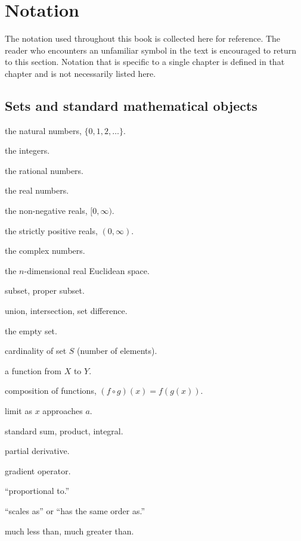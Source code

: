 \chapter*{Notation}

The notation used throughout this book is collected here for reference.
The reader who encounters an unfamiliar symbol in the text is
encouraged to return to this section. Notation that is specific to a
single chapter is defined in that chapter and is not necessarily
listed here.

\section*{Sets and standard mathematical objects}

\begin{notationbox}
\begin{description}[leftmargin=3cm,style=nextline]
    \item[{$\mathbb{N}$}] the natural numbers, $\{0, 1, 2, \dots\}$.
    \item[{$\mathbb{Z}$}] the integers.
    \item[{$\mathbb{Q}$}] the rational numbers.
    \item[{$\mathbb{R}$}] the real numbers.
    \item[{$\mathbb{R}_+$}] the non-negative reals, $[0, \infty)$.
    \item[{$\mathbb{R}_{++}$}] the strictly positive reals, $(0, \infty)$.
    \item[{$\mathbb{C}$}] the complex numbers.
    \item[{$\mathbb{R}^n$}] the $n$-dimensional real Euclidean space.
    \item[{$\subseteq, \subset$}] subset, proper subset.
    \item[{$\cup, \cap, \setminus$}] union, intersection, set difference.
    \item[{$\emptyset$}] the empty set.
    \item[{$|S|$}] cardinality of set $S$ (number of elements).
    \item[{$f: X \to Y$}] a function from $X$ to $Y$.
    \item[{$f \circ g$}] composition of functions, $(f \circ g)(x) = f(g(x))$.
    \item[{$\lim_{x\to a}$}] limit as $x$ approaches $a$.
    \item[{$\sum, \prod, \int$}] standard sum, product, integral.
    \item[{$\partial / \partial x$}] partial derivative.
    \item[{$\nabla$}] gradient operator.
    \item[{$\propto$}] ``proportional to.''
    \item[{$\sim$}] ``scales as'' or ``has the same order as.''
    \item[{$\ll, \gg$}] much less than, much greater than.
\end{description}
\end{notationbox}

